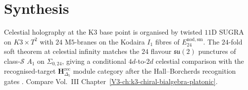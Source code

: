 \section{Synthesis}
\label{sec:ch-supplement}

\begin{remark}
\label{rem:ch-1}
Celestial holography at the K3 base point is organised by
twisted $11$D SUGRA on $K3\times T^2$ with $24$ M$5$-branes on the
Kodaira $I_1$ fibres of $E^{\mathrm{nod,sm}}_{24}$. The $24$-fold soft
theorem at celestial infinity matches the $24$ flavour
$\mathfrak{su}(2)$ punctures of class-$\mathcal S$ $A_1$ on
$\Sigma_{0,24}$, giving a conditional $4d$-to-$2d$ celestial comparison
with the recognised-target
$\mathbf H_{\Delta_5}^{\mathrm{rec}}$ module category after the
Hall--Borcherds recognition gates
\cite{EguchiOoguriTachikawa2010,Gaiotto2009}.
Compare Vol.~III Chapter~\ref{V3-ch:k3-chiral-bialgebra-platonic}.
\end{remark}
